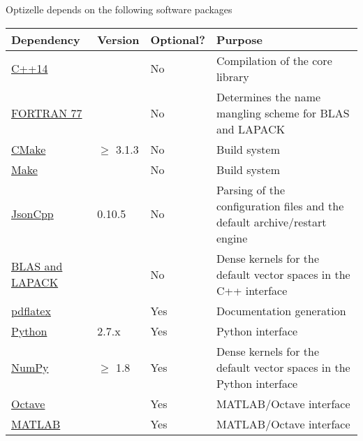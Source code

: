 \documentclass{report}
\begin{document}
        Optizelle depends on the following software packages
\begin{center}\begin{tabular}{|l|l|l|p{}|}\hline
{\bf Dependency} & {\bf Version} & {\bf Optional?} & {\bf Purpose} \\\hline
\hyperref[tbl:compilers]{C++14} & & No & Compilation of the core library\\\hline
\hyperref[tbl:compilers]{FORTRAN 77} & & No & Determines the name mangling scheme for BLAS and LAPACK\\\hline
\href{http://cmake.org}{CMake} & $\geq$ 3.1.3 & No & Build system\\\hline
\hyperref[tbl:make]{Make} & & No & Build system\\\hline
\href{https://github.com/open-source-parsers/jsoncpp}{JsonCpp} & 0.10.5 & No & Parsing of the configuration files and the default archive/restart engine\\\hline
\hyperref[tbl:blaslapack]{BLAS and LAPACK} & & No & Dense kernels for the default vector spaces in the C++ interface\\\hline
\href{http://www.ctan.org}{pdflatex} & & Yes & Documentation generation \\\hline
\href{http://python.org}{Python} & 2.7.x & Yes & Python interface \\\hline
\href{http://www.numpy.org}{NumPy} & $\geq$ 1.8 & Yes & Dense kernels for the default vector spaces in the Python interface\\\hline
\href{https://www.gnu.org/software/octave}{Octave} & & Yes & MATLAB/Octave interface\\\hline
\href{http://www.mathworks.com/products/matlab}{MATLAB} & & Yes & MATLAB/Octave interface\\\hline
\end{tabular}\end{center}
\end{document}

